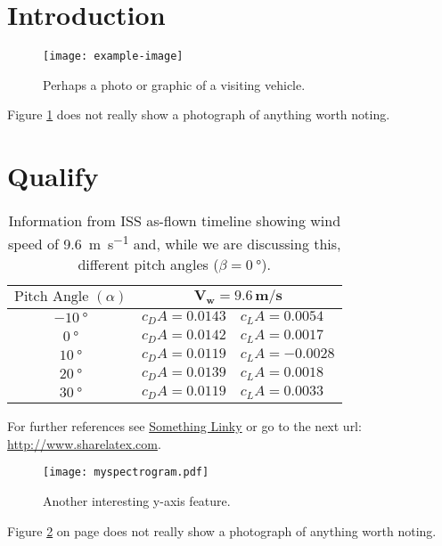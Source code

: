 \documentclass[journal,comsoc]{IEEEtran}
\begin{document}
\renewcommand{\thetable}{\arabic{table}}
\renewcommand \thesection{\arabic{section}} %

\section{Introduction}

\lipsum[2]

\begin{figure}[thb]
	\centering  
	\texttt{[image: example-image]}
	\caption{Perhaps a photo or graphic of a visiting vehicle.}
	\label{fig:graysquare}
\end{figure}

Figure \ref{fig:graysquare} does not really show a photograph of anything worth noting.  \lipsum[1]


\section{Qualify}

\lipsum[1]


\begin{table}
	\centering
	\begin{tabular}{|c|l|l|}
	\hline
	\textbf{$\text{Pitch Angle } (\alpha)$}&\multicolumn{2}{c|}{$\mathbf{V_w=9.6\,m/s}$}\\
	\hline
	$\SI{-10}{\degree}$&$c_DA=0.0143$&$c_LA=0.0054$\\
	\hline
	$\SI{0}{\degree}$&$c_DA=0.0142$&$c_LA=0.0017$\\
	\hline
	$\SI{10}{\degree}$&$c_DA=0.0119$&$c_LA=-0.0028$\\
	\hline
	$\SI{20}{\degree}$&$c_DA=0.0139$&$c_LA=0.0018$\\
	\hline
	$\SI{30}{\degree}$&$c_DA=0.0119$&$c_LA=0.0033$\\
	\hline
	\end{tabular}
	\caption{Information from ISS as-flown timeline showing wind speed of \SI{9.6}{\meter\per\second} and, while we are discussing this, different pitch angles ($\beta=\SI{0}{\degree}$).}
	\label{table:draglift1}
\end{table}

\lipsum[1]

For further references see \href{http://www.sharelatex.com}{Something Linky} or go to the next url: \url{http://www.sharelatex.com}.

\lipsum[1]

\begin{figure}[thb]
	\centering  
	\texttt{[image: myspectrogram.pdf]}
	\caption{Another interesting y-axis feature.}
	\label{fig:specgram}
\end{figure}

Figure \ref{fig:specgram} on page \pageref{fig:specgram} does not really show a photograph of anything worth noting.  \lipsum
\end{document}
